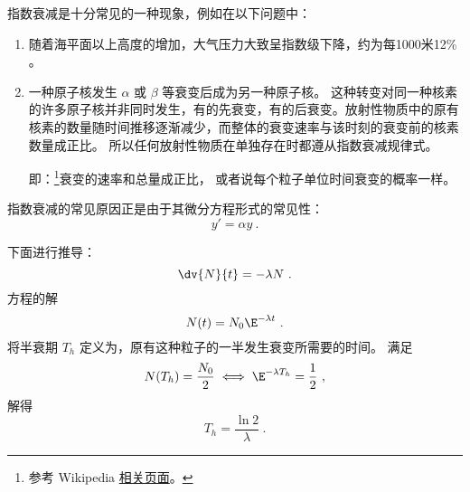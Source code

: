 
\begin{issues}
\issueDraft
\end{issues}


指数衰减是十分常见的一种现象，例如在以下问题中：

\begin{enumerate}
\item 随着海平面以上高度的增加，大气压力大致呈指数级下降，约为每1000米12\% 。
\item 一种原子核发生 $\alpha$ 或 $\beta$ 等衰变后成为另一种原子核。
这种转变对同一种核素的许多原子核并非同时发生，有的先衰变，有的后衰变。放射性物质中的原有核素的数量随时间推移逐渐减少，而整体的衰变速率与该时刻的衰变前的核素数量成正比。
所以任何放射性物质在单独存在时都遵从指数衰减规律式。

即：\footnote{参考 Wikipedia \href{https://en.wikipedia.org/wiki/Exponential_decay}{相关页面}。}衰变的速率和总量成正比， 或者说每个粒子单位时间衰变的概率一样。
\end{enumerate}

指数衰减的常见原因正是由于其微分方程形式的常见性：
$$y' = \alpha y ~.$$

下面进行推导：
\begin{equation}
\dv{N}{t} = -\lambda N~.
\end{equation}
方程的解
\begin{equation}
N(t) = N_0 \E^{-\lambda t}~.
\end{equation}
将半衰期 $T_h$ 定义为，原有这种粒子的一半发生衰变所需要的时间。 满足
\begin{equation}
N(T_h) = \frac{N_0}{2} \iff \E^{-\lambda T_h} = \frac{1}{2}~,
\end{equation}
解得
\begin{equation}
T_h = \frac{\ln 2}{\lambda}~.
\end{equation}
